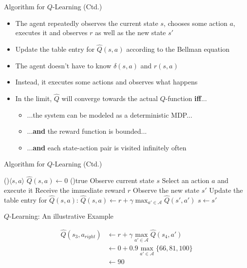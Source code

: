 \begin{frame}{Algorithm for $Q$-Learning (Ctd.)}{}
	\begin{itemize}
		\item The agent repeatedly observes the current state $s$, chooses some action $a$, executes it and
			observes $r$ as well as the new state $s'$
		\item Update the table entry for $\widehat{Q}(s, a)$ according to the Bellman equation
		\item The agent doesn't have to know $\delta(s, a)$ and $r(s, a)$
		\item Instead, it executes some actions and observes what happens
		\item In the limit, $\widehat{Q}$ will converge towards the actual $Q$-function \textbf{iff}...
		\begin{itemize}
			\item ...the system can be modeled as a deterministic MDP...
			\item ...\textbf{and} the reward function is bounded...
			\item ...\textbf{and} each state-action pair is visited infinitely often
		\end{itemize}
	\end{itemize}
\end{frame}


\begin{frame}{Algorithm for $Q$-Learning (Ctd.)}{}
	\begin{algorithm}[H]
		\footnotesize
		\DontPrintSemicolon
 		\ForEach(){$\langle s, a \rangle$}{
 			$\widehat{Q}(s, a) \longleftarrow 0$ \;
 		}
		\While(){true}{
  			Observe current state $s$\;
  			Select an action $a$ and execute it\;
  			Receive the immediate reward $r$\;
  			Observe the new state $s'$\;
  			Update the table entry for $\widehat{Q}(s, a)$:
  				$\widehat{Q}(s, a) \longleftarrow r + \gamma \max_{a' \in \mathcal{A}} \widehat{Q}(s', a')$\;
  			$s \longleftarrow s'$\;
 		}
 		\caption{Learning the $Q$-function}
	\end{algorithm}
\end{frame}


\begin{frame}{$Q$-Learning: An illustrative Example}{}
	
	\vspace*{-2mm}
	\begin{align*}
		\widehat{Q}(s_3, a_{right}) 	&\longleftarrow r + \gamma \max_{a' \in \mathcal{A}} \widehat{Q}(s_4, a') \\
								&\longleftarrow 0 + 0.9 \max_{a' \in \mathcal{A}}\{66,81,100\} \\
								&\longleftarrow 90
	\end{align*}
\end{frame}


